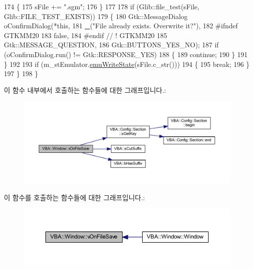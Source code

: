 \begin{DoxyCode}
174     \{
175       sFile += \textcolor{stringliteral}{".sgm"};
176     \}
177 
178     \textcolor{keywordflow}{if} (Glib::file\_test(sFile, Glib::FILE\_TEST\_EXISTS))
179     \{
180       Gtk::MessageDialog oConfirmDialog(*\textcolor{keyword}{this},
181                                         \mbox{\hyperlink{getopt_8c_a86a239addea586602343007a370bf8ad}{\_}}(\textcolor{stringliteral}{"File already exists. Overwrite it?"}),
182 #ifndef GTKMM20
183                                         \textcolor{keyword}{false},
184 #endif \textcolor{comment}{// ! GTKMM20}
185                                         Gtk::MESSAGE\_QUESTION,
186                                         Gtk::BUTTONS\_YES\_NO);
187       \textcolor{keywordflow}{if} (oConfirmDialog.run() != Gtk::RESPONSE\_YES)
188       \{
189         \textcolor{keywordflow}{continue};
190       \}
191     \}
192 
193     \textcolor{keywordflow}{if} (m\_stEmulator.\mbox{\hyperlink{struct_emulated_system_a649c6ceaabee941f263a32fa8a73a9c5}{emuWriteState}}(sFile.c\_str()))
194     \{
195       \textcolor{keywordflow}{break};
196     \}
197   \}
198 \}
\end{DoxyCode}
이 함수 내부에서 호출하는 함수들에 대한 그래프입니다.\+:
\nopagebreak
\begin{figure}[H]
\begin{center}
\leavevmode
\includegraphics[width=350pt]{class_v_b_a_1_1_window_a27bb0ed15cc90758c95eb11fddd14a86_cgraph}
\end{center}
\end{figure}
이 함수를 호출하는 함수들에 대한 그래프입니다.\+:
\nopagebreak
\begin{figure}[H]
\begin{center}
\leavevmode
\includegraphics[width=350pt]{class_v_b_a_1_1_window_a27bb0ed15cc90758c95eb11fddd14a86_icgraph}
\end{center}
\end{figure}
\mbox{\label{class_v_b_a_1_1_window_ae96308c56cf84f9c56dc97c196adc49c}} 
